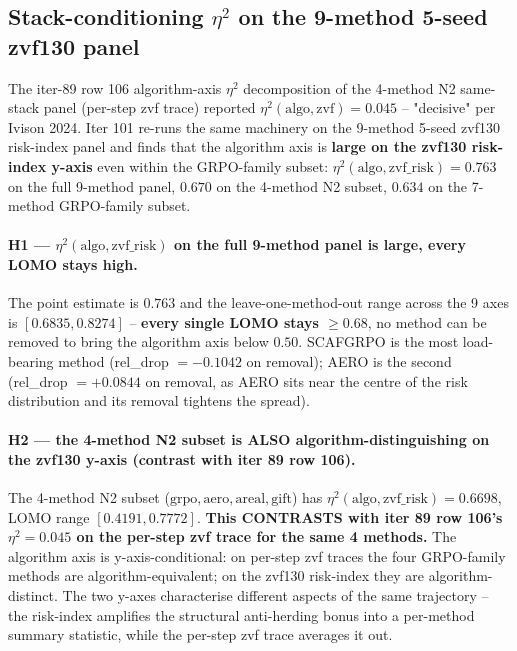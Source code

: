 \subsection{Stack-conditioning $\eta^2$ on the 9-method 5-seed zvf130 panel}
\label{sec:p5-iter101-zvf130-eta2}

The iter-89 row 106 algorithm-axis $\eta^2$ decomposition of the
4-method N2 same-stack panel (per-step zvf trace) reported
$\eta^2(\mathrm{algo}, \mathrm{zvf}) = 0.045$ -- "decisive" per Ivison
2024. Iter 101 re-runs the same machinery on the 9-method 5-seed
zvf130 risk-index panel and finds that the algorithm axis is
\textbf{large on the zvf130 risk-index y-axis} even within the
GRPO-family subset:
$\eta^2(\mathrm{algo}, \mathrm{zvf\_risk}) = 0.763$ on the full
9-method panel, $0.670$ on the 4-method N2 subset, $0.634$ on the
7-method GRPO-family subset.

\paragraph{H1 --- $\eta^2(\mathrm{algo}, \mathrm{zvf\_risk})$ on the
full 9-method panel is large, every LOMO stays high.}
The point estimate is $0.763$ and the leave-one-method-out range
across the 9 axes is $[0.6835, 0.8274]$ -- \textbf{every single LOMO
stays $\geq 0.68$}, no method can be removed to bring the algorithm
axis below $0.50$. SCAFGRPO is the most load-bearing method
(rel\_drop $= -0.1042$ on removal); AERO is the second
(rel\_drop $= +0.0844$ on removal, as AERO sits near the centre of
the risk distribution and its removal tightens the spread).

\paragraph{H2 --- the 4-method N2 subset is ALSO algorithm-distinguishing
on the zvf130 y-axis (contrast with iter 89 row 106).}
The 4-method N2 subset ($\mathrm{grpo, aero, areal, gift}$)
has $\eta^2(\mathrm{algo}, \mathrm{zvf\_risk}) = 0.6698$, LOMO range
$[0.4191, 0.7772]$. \textbf{This CONTRASTS with iter 89 row 106's
$\eta^2 = 0.045$ on the per-step zvf trace for the same 4 methods.}
The algorithm axis is y-axis-conditional: on per-step zvf traces
the four GRPO-family methods are algorithm-equivalent; on the
zvf130 risk-index they are algorithm-distinct. The two y-axes
characterise different aspects of the same trajectory -- the
risk-index amplifies the structural anti-herding bonus into a
per-method summary statistic, while the per-step zvf trace averages
it out.

